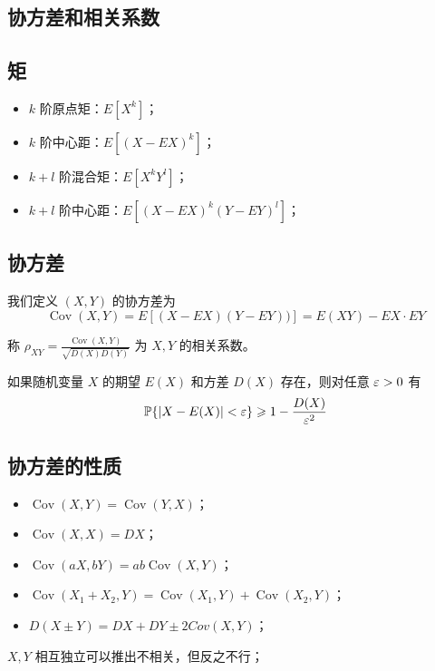 \subsection{协方差和相关系数}

\subsection*{矩}
\begin{itemize}
	\item $k$ 阶原点矩：$E[X^k]$；
	\item $k$ 阶中心距：$E[(X - EX)^k]$；
	\item $k + l$ 阶混合矩：$E[X^k Y^l]$；
	\item $k + l$ 阶中心距：$E[(X - EX)^k (Y - EY)^l]$；
\end{itemize}

\subsection*{协方差}

\newcommand{\opCov}{\operatorname{Cov}}

我们定义 $(X, Y)$ 的协方差为
\[ \opCov(X, Y) = E[(X - EX)(Y - EY))] = E(XY) - EX \cdot EY \]

称 $\rho_{XY} = \frac{\opCov(X, Y)}{\sqrt{D(X) D(Y)}}$ 为 $X, Y$ 的相关系数。

\begin{theorem}[切比雪夫不等式]
	如果随机变量 $X$ 的期望 $E(X)$ 和方差 $D(X)$ 存在，则对任意 $\varepsilon > 0$ 有
	\[ \mathbb{P}\{|X - E(X)| < \varepsilon\} \geqslant 1 - \frac{D(X)}{\varepsilon^2} \]
\end{theorem}



\subsection*{协方差的性质}

\begin{itemize}
	\item $\opCov(X, Y) = \opCov(Y, X)$；
	\item $\opCov(X, X) = DX$；
	\item $\opCov(aX, bY) = ab \opCov(X, Y)$；
	\item $\opCov(X_1 + X_2, Y) = \opCov(X_1, Y) + \opCov(X_2, Y)$；
	\item $D(X \pm Y) = DX + DY \pm 2Cov(X, Y)$；
\end{itemize}

$X, Y$ 相互独立可以推出不相关，但反之不行；

